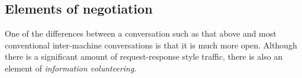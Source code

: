 \subsection{Elements of negotiation}
One of the differences between a conversation such as that above and most conventional inter-machine conversations is that it is much more open. Although there is a significant amount of request-response style traffic, there is also an element of \emph{information volunteering}.

